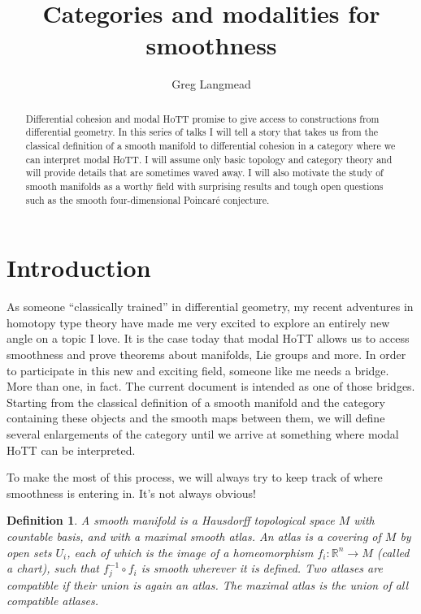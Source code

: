 \documentclass[12pt]{article}
\title{Categories and modalities for smoothness}
\author{Greg Langmead}
\newtheorem{mydef}{Definition}
\begin{document}
\maketitle
\begin{abstract}
Differential cohesion and modal HoTT promise to give access to constructions from differential geometry. In this series of talks I will tell a story that takes us from the classical definition of a smooth manifold to differential cohesion in a category where we can interpret modal HoTT. I will assume only basic topology and category theory and will provide details that are sometimes waved away. I will also motivate the study of smooth manifolds as a worthy field with surprising results and tough open questions such as the smooth four-dimensional Poincaré conjecture.
\end{abstract}
\tableofcontents
\section{Introduction}\label{sec:introduction}
As someone ``classically trained'' in differential geometry, my recent adventures in homotopy type theory have made me very excited to explore an entirely new angle on a topic I love. It is the case today that modal HoTT allows us to access smoothness and prove theorems about manifolds, Lie groups and more. In order to participate in this new and exciting field, someone like me needs a bridge. More than one, in fact. The current document is intended as one of those bridges. Starting from the classical definition of a smooth manifold and the category containing these objects and the smooth maps between them, we will define several enlargements of the category until we arrive at something where modal HoTT can be interpreted.

To make the most of this process, we will always try to keep track of where smoothness is entering in. It's not always obvious!

\begin{mydef}\label{def:smoothmfd}
A smooth manifold is a Hausdorff topological space $M$ with countable basis, and with a maximal smooth atlas. An atlas is a covering of $M$ by open sets $U_i$, each of which is the image of a homeomorphism $f_i:\mathbb{R}^n\to M$ (called a \emph{chart}), such that $f_j^{-1}\circ f_i$ is smooth wherever it is defined. Two atlases are compatible if their union is again an atlas. The maximal atlas is the union of all compatible atlases.
\end{mydef}
\end{document}
